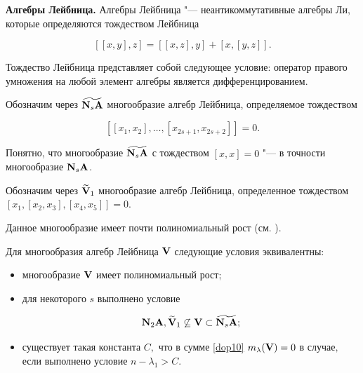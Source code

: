 \smallskip



{\bf Алгебры Лейбница.} Алгебры Лейбница "--- неантикоммутативные алгебры Ли, которые определяются тождеством Лейбница

$$

[[x,y],z]=[[x,z],y]+[x,[y,z]].

$$

Тождество Лейбница представляет собой следующее условие: оператор правого умножения на любой элемент алгебры является дифференцированием.



Обозначим через $\widetilde{{\bf N}_s {\bf A}}$ многообразие алгебр Лейбница, определяемое тождеством

$$

   [[x_1,x_2], \dots ,[x_{2s+1},x_{2s+2}]]=0.

$$

Понятно, что многообразие $\widetilde{{\bf N}_s {\bf A}}$ с тождеством $[x,x]=0$ "--- в точности многообразие ${\bf N}_s{\bf A}$.



Обозначим через $\widetilde{\bf V}_1$ многообразие алгебр Лейбница, определенное тождеством $[x_1,[x_2,x_3],[x_4,x_5]]=0.$

Данное многообразие имеет почти полиномиальный рост (см. \cite{cherev:bib:M-V}).



\smallskip



\begin{theorem} 

Для многообразия алгебр Лейбница ${\bf V}$ следующие условия эквивалентны\/$:$



\begin{itemize}



\item[\rm (i)] многообразие ${\bf V}$ имеет полиномиальный рост\/$;$



\item[\rm (ii)] для некоторого $s$ выполнено условие 

$$

{\bf N}_2{\bf A},\widetilde{\bf V}_1\not\subseteq {\bf V} \subset

\widetilde{{\bf N}_s {\bf A}};

$$



\item[\rm (iii)]  существует такая константа $C,$ что в сумме \eqref{dop10}  $m_\lambda({\bf V}) = 0$ в случае$,$ если выполнено условие $n - \lambda_1 > C.$





\end{itemize}



\end{theorem}



